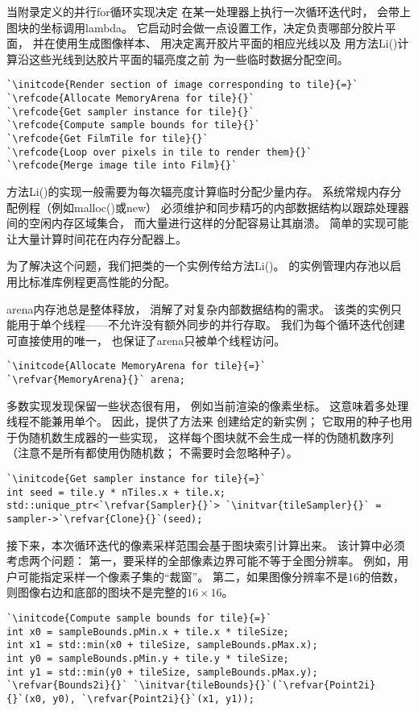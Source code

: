 当附录定义的并行{\ttfamily for}循环实现决定
在某一处理器上执行一次循环迭代时，
会带上图块的坐标调用lambda。
它启动时会做一点设置工作，决定负责哪部分胶片平面，
并在使用生成图像样本、
用决定离开胶片平面的相应光线以及
用方法{\ttfamily Li()}计算沿这些光线到达胶片平面的辐亮度之前
为一些临时数据分配空间。
\begin{lstlisting}
`\initcode{Render section of image corresponding to tile}{=}`
`\refcode{Allocate MemoryArena for tile}{}`
`\refcode{Get sampler instance for tile}{}`
`\refcode{Compute sample bounds for tile}{}`
`\refcode{Get FilmTile for tile}{}`
`\refcode{Loop over pixels in tile to render them}{}`
`\refcode{Merge image tile into Film}{}`
\end{lstlisting}

方法{\ttfamily Li()}的实现一般需要为每次辐亮度计算临时分配少量内存。
系统常规内存分配例程（例如{\ttfamily malloc()}或{\ttfamily new}）
必须维护和同步精巧的内部数据结构以跟踪处理器间的空闲内存区域集合，
而大量进行这样的分配容易让其崩溃。
简单的实现可能让大量计算时间花在内存分配器上。

为了解决这个问题，我们把类的一个实例传给方法{\ttfamily Li()}。
的实例管理内存池以启用比标准库例程更高性能的分配。

arena内存池总是整体释放，
消解了对复杂内部数据结构的需求。
该类的实例只能用于单个线程——不允许没有额外同步的并行存取。
我们为每个循环迭代创建可直接使用的唯一，
也保证了arena只被单个线程访问。
\begin{lstlisting}
`\initcode{Allocate MemoryArena for tile}{=}`
`\refvar{MemoryArena}{}` arena;
\end{lstlisting}

多数实现发现保留一些状态很有用，
例如当前渲染的像素坐标。
这意味着多处理线程不能兼用单个。
因此，提供了方法来
创建给定的新实例；
它取用的种子也用于伪随机数生成器的一些实现，
这样每个图块就不会生成一样的伪随机数序列
（注意不是所有都使用伪随机数；
不需要时会忽略种子）。
\begin{lstlisting}
`\initcode{Get sampler instance for tile}{=}`
int seed = tile.y * nTiles.x + tile.x;
std::unique_ptr<`\refvar{Sampler}{}`> `\initvar{tileSampler}{}` = sampler->`\refvar{Clone}{}`(seed);
\end{lstlisting}

接下来，本次循环迭代的像素采样范围会基于图块索引计算出来。
该计算中必须考虑两个问题：
第一，要采样的全部像素边界可能不等于全图分辨率。
例如，用户可能指定采样一个像素子集的“裁窗”。
第二，如果图像分辨率不是16的倍数，则图像右边和底部的图块不是完整的$16\times16$。
\begin{lstlisting}
`\initcode{Compute sample bounds for tile}{=}`
int x0 = sampleBounds.pMin.x + tile.x * tileSize;
int x1 = std::min(x0 + tileSize, sampleBounds.pMax.x);
int y0 = sampleBounds.pMin.y + tile.y * tileSize;
int y1 = std::min(y0 + tileSize, sampleBounds.pMax.y);
`\refvar{Bounds2i}{}` `\initvar{tileBounds}{}`(`\refvar{Point2i}{}`(x0, y0), `\refvar{Point2i}{}`(x1, y1));
\end{lstlisting}

